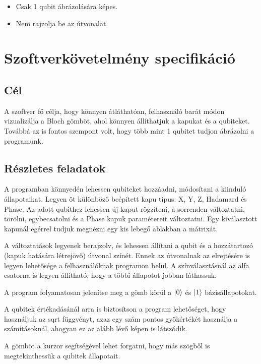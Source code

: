 \documentclass[fontsize=12pt,a4paper]{article}
\begin{document}
\begin{itemize}
    \item Csak 1 qubit ábrázolására képes.
    \item Nem rajzolja be az útvonalat.
\end{itemize}

\newpage
\section{Szoftverkövetelmény specifikáció}

\subsection{Cél}
A szoftver fő célja, hogy könnyen átláthatóan, felhasználó barát módon vizualizálja a Bloch gömböt, ahol könnyen állíthatjuk a kapukat és a qubiteket. Továbbá az is fontos szempont volt, hogy több mint 1 qubitet tudjon ábrázolni a programunk.

\subsection{Részletes feladatok}
A programban könnyedén lehessen qubiteket hozzáadni, módosítani a kiinduló állapotaikat. Legyen öt különböző beépített kapu típus: X, Y, Z, Hadamard és Phase. Az adott qubithez lehessen új kaput rögzíteni, a sorrenden változtatni, törölni, egybecsatolni és a Phase kapuk paramétereit változtatni. Egy kiválasztott kapunál egérrel tudjuk megnézni egy kis lebegő ablakban a mátrixát.

A változtatások legyenek berajzolv, és lehessen állítani a qubit és a hozzátartozó (kapuk hatására létrejövő) útvonal  színét. Ennek az útvonalnak az elrejtésére is legyen lehetősége a felhasználóknak programon belül. A színválasztásnál az alfa csatorna is legyen állítható, hogy a többi állapotot jobban láthassuk. 

A program folyamatosan jelenítse meg a gömb körül a $\ket{0}$ és $\ket{1}$ bázisállapotokat.

A qubitek értékadásánál arra is biztosítson a program lehetőséget, hogy használjuk az sqrt függvényt, azaz egy szám pontos gyökértékét használja a számításoknál, ahogyan ez az alább lévő képen is látszódik.

A gömböt a kurzor segítségével lehet forgatni, hogy más szögből is megtekinthessük a qubitek állapotait.
\end{document}
